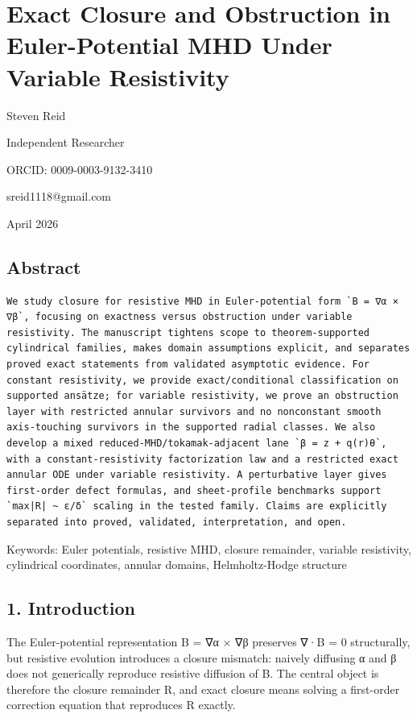 \documentclass[11pt]{article}
\begin{document}
\section*{Exact Closure and Obstruction in Euler-Potential MHD Under Variable Resistivity}

Steven Reid

Independent Researcher

ORCID: 0009-0003-9132-3410

sreid1118@gmail.com

April 2026


\subsection*{Abstract}
\begin{verbatim}
We study closure for resistive MHD in Euler-potential form `B = ∇α × ∇β`, focusing on exactness versus obstruction under variable resistivity. The manuscript tightens scope to theorem-supported cylindrical families, makes domain assumptions explicit, and separates proved exact statements from validated asymptotic evidence. For constant resistivity, we provide exact/conditional classification on supported ansätze; for variable resistivity, we prove an obstruction layer with restricted annular survivors and no nonconstant smooth axis-touching survivors in the supported radial classes. We also develop a mixed reduced-MHD/tokamak-adjacent lane `β = z + q(r)θ`, with a constant-resistivity factorization law and a restricted exact annular ODE under variable resistivity. A perturbative layer gives first-order defect formulas, and sheet-profile benchmarks support `max|R| ~ ε/δ` scaling in the tested family. Claims are explicitly separated into proved, validated, interpretation, and open.
\end{verbatim}

Keywords: Euler potentials, resistive MHD, closure remainder, variable resistivity, cylindrical coordinates, annular domains, Helmholtz-Hodge structure


\subsection*{1. Introduction}
The Euler-potential representation B = ∇α × ∇β preserves ∇·B = 0 structurally, but resistive evolution introduces a closure mismatch: naively diffusing α and β does not generically reproduce resistive diffusion of B. The central object is therefore the closure remainder R, and exact closure means solving a first-order correction equation that reproduces R exactly.
\end{document}
